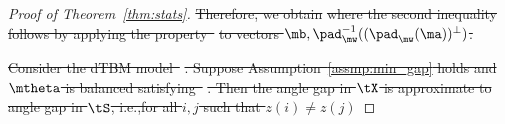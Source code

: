 \documentclass[lettersize,onecolumn,journal]{IEEEtran}
\theoremstyle{definition}
\newtheorem{lem}{Lemma}
\theoremstyle{definition}
\providecommand{\DIFdeltex}[1]{{\protect\color{red}\sout{#1}}}                      %
\providecommand{\DIFdel}[1]{\texorpdfstring{\DIFdeltex{#1}}{}} %
\begin{document}
\begin{proof}[Proof of Theorem~\ref{thm:stats}]
\DIFdel{Therefore, we obtain 
}%
\DIFdel{where the second inequality follows by applying the property~}%
\DIFdel{to vectors $\mb, \pad_{\mw}^{-1}((\pad_{\mw}(\ma))^{\perp})$.
}%

\DIFdel{Consider the dTBM model~}%
\DIFdel{. Suppose Assumption~\ref{assmp:min_gap} holds and $\mtheta$ is balanced satisfying~}%
\DIFdel{. Then the angle gap in $\tX$ is approximate to angle gap in $\tS$, i.e.,for all $i,j$ such that $z(i) \neq z(j)$
}%



\end{proof}
\end{document}
